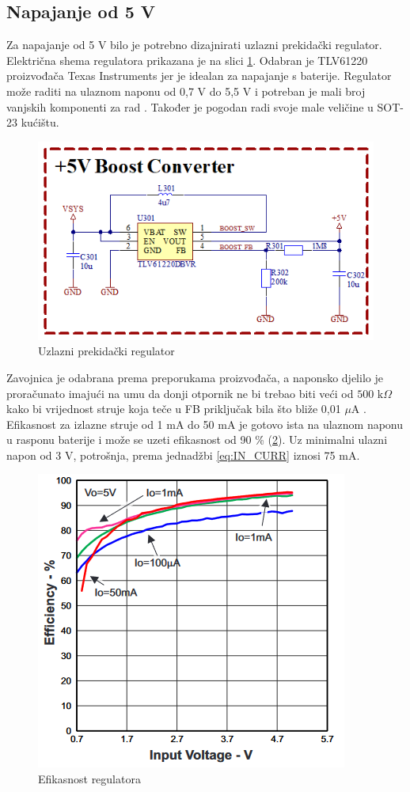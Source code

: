 \subsection{Napajanje od 5 V}

Za napajanje od 5 V bilo je potrebno dizajnirati uzlazni prekidački regulator. Električna shema regulatora prikazana je na slici \ref{slk:BR_BOOST}. Odabran je TLV61220 proizvođača Texas Instruments jer je idealan za napajanje s baterije. Regulator može raditi na ulaznom naponu od 0,7 V do 5,5 V i potreban je mali broj vanjskih komponenti za rad \cite{ti:tlv61220}. Također je pogodan radi svoje male veličine u SOT-23 kućištu.
\begin{figure}[htb]
    \centering
    \includegraphics[width=10 cm]{Figures/BR_BOOST.png}
    \caption{Uzlazni prekidački regulator}
    \label{slk:BR_BOOST}
\end{figure}
Zavojnica je odabrana prema preporukama proizvođača, a naponsko djelilo je proračunato imajući na umu da donji otpornik ne bi trebao biti veći od $500\textrm{ k}\Omega$ kako bi vrijednost struje koja teče u FB priključak bila što bliže 0,01 $\mu\textrm{A}$ \cite{ti:tlv61220}. Efikasnost za izlazne struje od 1 mA do 50 mA je gotovo ista na ulaznom naponu u rasponu baterije i može se uzeti efikasnost od 90 \% (\ref{slk:BOOST_EFF}). Uz minimalni ulazni napon od 3 V, potrošnja, prema jednadžbi \ref{eq:IN_CURR} iznosi 75 mA.
\begin{figure}[H]
    \centering
    \includegraphics[width=6 cm]{Figures/BOOST_EFF.png}
    \caption{Efikasnost regulatora \cite{ti:tlv61220}}
    \label{slk:BOOST_EFF}
\end{figure}

